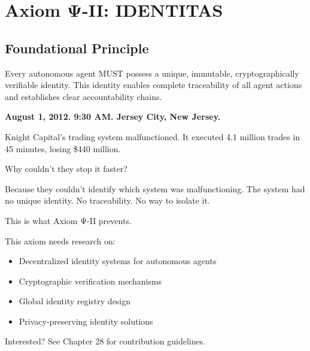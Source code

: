 
\chapter{Axiom Ψ-II: IDENTITAS}
\label{ch:axiom-II}

\section*{Foundational Principle}

\begin{principlebox}
Every autonomous agent MUST possess a unique, immutable, cryptographically verifiable identity. This identity enables complete traceability of all agent actions and establishes clear accountability chains.
\end{principlebox}

\vspace{0.5cm}

\begin{tcolorbox}[colback=lightgray, colframe=legislativeblue, title=\textbf{📖 Why This Axiom Matters}]
\textbf{August 1, 2012. 9:30 AM. Jersey City, New Jersey.}

Knight Capital's trading system malfunctioned. It executed 4.1 million trades in 45 minutes, losing \$440 million.

Why couldn't they stop it faster?

Because they couldn't identify which system was malfunctioning. The system had no unique identity. No traceability. No way to isolate it.

This is what Axiom Ψ-II prevents.
\end{tcolorbox}

\vspace{0.5cm}

\begin{tcolorbox}[colback=lightgray, colframe=accentgold, title=\textbf{🎯 Contribution Opportunity}]
This axiom needs research on:
\begin{itemize}
    \item Decentralized identity systems for autonomous agents
    \item Cryptographic verification mechanisms
    \item Global identity registry design
    \item Privacy-preserving identity solutions
\end{itemize}

Interested? See Chapter 28 for contribution guidelines.
\end{tcolorbox}

